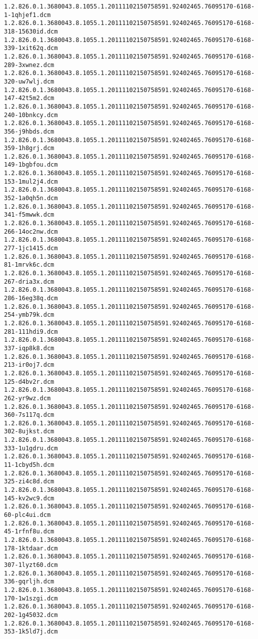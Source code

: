 \begin{lstlisting}
1.2.826.0.1.3680043.8.1055.1.20111102150758591.92402465.76095170-6168-1-1qhjef1.dcm 1.2.826.0.1.3680043.8.1055.1.20111102150758591.92402465.76095170-6168-318-15630id.dcm 1.2.826.0.1.3680043.8.1055.1.20111102150758591.92402465.76095170-6168-339-1xit62q.dcm 1.2.826.0.1.3680043.8.1055.1.20111102150758591.92402465.76095170-6168-289-3xwnez.dcm 1.2.826.0.1.3680043.8.1055.1.20111102150758591.92402465.76095170-6168-320-uw7wlj.dcm 1.2.826.0.1.3680043.8.1055.1.20111102150758591.92402465.76095170-6168-147-42t5m2.dcm 1.2.826.0.1.3680043.8.1055.1.20111102150758591.92402465.76095170-6168-240-10bnkcy.dcm 1.2.826.0.1.3680043.8.1055.1.20111102150758591.92402465.76095170-6168-356-j9hbds.dcm 1.2.826.0.1.3680043.8.1055.1.20111102150758591.92402465.76095170-6168-359-1h8grj.dcm 1.2.826.0.1.3680043.8.1055.1.20111102150758591.92402465.76095170-6168-149-1bgbfou.dcm 1.2.826.0.1.3680043.8.1055.1.20111102150758591.92402465.76095170-6168-153-1mul2j4.dcm 1.2.826.0.1.3680043.8.1055.1.20111102150758591.92402465.76095170-6168-352-1a0qh5n.dcm 1.2.826.0.1.3680043.8.1055.1.20111102150758591.92402465.76095170-6168-341-f5mwwk.dcm 1.2.826.0.1.3680043.8.1055.1.20111102150758591.92402465.76095170-6168-266-14oc2nw.dcm 1.2.826.0.1.3680043.8.1055.1.20111102150758591.92402465.76095170-6168-277-1jc1415.dcm 1.2.826.0.1.3680043.8.1055.1.20111102150758591.92402465.76095170-6168-81-1mrvk6c.dcm 1.2.826.0.1.3680043.8.1055.1.20111102150758591.92402465.76095170-6168-267-dria3x.dcm 1.2.826.0.1.3680043.8.1055.1.20111102150758591.92402465.76095170-6168-286-16eg38q.dcm 1.2.826.0.1.3680043.8.1055.1.20111102150758591.92402465.76095170-6168-254-ymb79k.dcm 1.2.826.0.1.3680043.8.1055.1.20111102150758591.92402465.76095170-6168-281-111hdi9.dcm 1.2.826.0.1.3680043.8.1055.1.20111102150758591.92402465.76095170-6168-337-iqp8k8.dcm 1.2.826.0.1.3680043.8.1055.1.20111102150758591.92402465.76095170-6168-213-ir0oj7.dcm 1.2.826.0.1.3680043.8.1055.1.20111102150758591.92402465.76095170-6168-125-d4bv2r.dcm 1.2.826.0.1.3680043.8.1055.1.20111102150758591.92402465.76095170-6168-262-yr9wz.dcm 1.2.826.0.1.3680043.8.1055.1.20111102150758591.92402465.76095170-6168-360-7s117q.dcm 1.2.826.0.1.3680043.8.1055.1.20111102150758591.92402465.76095170-6168-302-8ujkst.dcm 1.2.826.0.1.3680043.8.1055.1.20111102150758591.92402465.76095170-6168-333-1u1gdru.dcm 1.2.826.0.1.3680043.8.1055.1.20111102150758591.92402465.76095170-6168-11-1cbyd5h.dcm 1.2.826.0.1.3680043.8.1055.1.20111102150758591.92402465.76095170-6168-325-zi4c8d.dcm 1.2.826.0.1.3680043.8.1055.1.20111102150758591.92402465.76095170-6168-145-kv2wc9.dcm 1.2.826.0.1.3680043.8.1055.1.20111102150758591.92402465.76095170-6168-60-plc4ui.dcm 1.2.826.0.1.3680043.8.1055.1.20111102150758591.92402465.76095170-6168-45-1rfnf8u.dcm 1.2.826.0.1.3680043.8.1055.1.20111102150758591.92402465.76095170-6168-178-1ktdaar.dcm 1.2.826.0.1.3680043.8.1055.1.20111102150758591.92402465.76095170-6168-307-1lyzt60.dcm 1.2.826.0.1.3680043.8.1055.1.20111102150758591.92402465.76095170-6168-336-gqrljh.dcm 1.2.826.0.1.3680043.8.1055.1.20111102150758591.92402465.76095170-6168-170-1w1szgi.dcm 1.2.826.0.1.3680043.8.1055.1.20111102150758591.92402465.76095170-6168-202-1g45032.dcm 1.2.826.0.1.3680043.8.1055.1.20111102150758591.92402465.76095170-6168-353-1k5ld7j.dcm 
\end{lstlisting}
